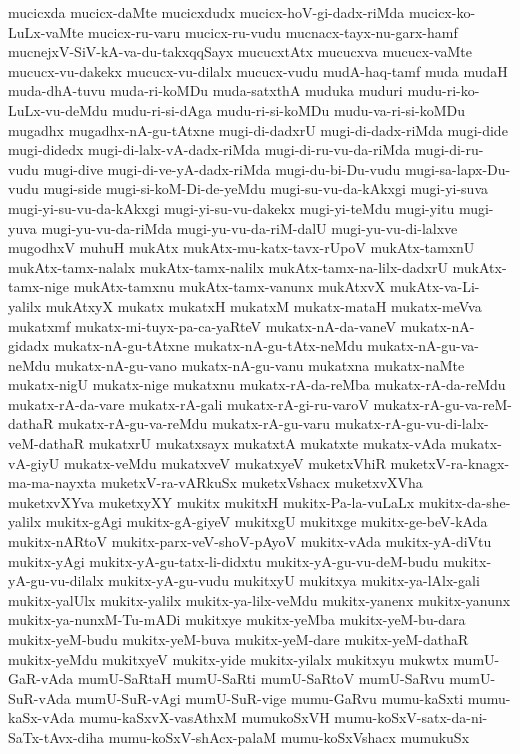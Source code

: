{mucicxda
mucicx-daMte
mucicxdudx
mucicx-hoV-gi-dadx-riMda
mucicx-ko-LuLx-vaMte
mucicx-ru-varu
mucicx-ru-vudu
mucnacx-tayx-nu-garx-hamf
mucnejxV-SiV-kA-va-du-takxqqSayx
mucucxtAtx
mucucxva
mucucx-vaMte
mucucx-vu-dakekx
mucucx-vu-dilalx
mucucx-vudu
mudA-haq-tamf
muda
mudaH
muda-dhA-tuvu
muda-ri-koMDu
muda-satxthA
muduka
muduri
mudu-ri-ko-LuLx-vu-deMdu
mudu-ri-si-dAga
mudu-ri-si-koMDu
mudu-va-ri-si-koMDu
mugadhx
mugadhx-nA-gu-tAtxne
mugi-di-dadxrU
mugi-di-dadx-riMda
mugi-dide
mugi-didedx
mugi-di-lalx-vA-dadx-riMda
mugi-di-ru-vu-da-riMda
mugi-di-ru-vudu
mugi-dive
mugi-di-ve-yA-dadx-riMda
mugi-du-bi-Du-vudu
mugi-sa-lapx-Du-vudu
mugi-side
mugi-si-koM-Di-de-yeMdu
mugi-su-vu-da-kAkxgi
mugi-yi-suva
mugi-yi-su-vu-da-kAkxgi
mugi-yi-su-vu-dakekx
mugi-yi-teMdu
mugi-yitu
mugi-yuva
mugi-yu-vu-da-riMda
mugi-yu-vu-da-riM-dalU
mugi-yu-vu-di-lalxve
mugodhxV
muhuH
mukAtx
mukAtx-mu-katx-tavx-rUpoV
mukAtx-tamxnU
mukAtx-tamx-nalalx
mukAtx-tamx-nalilx
mukAtx-tamx-na-lilx-dadxrU
mukAtx-tamx-nige
mukAtx-tamxnu
mukAtx-tamx-vanunx
mukAtxvX
mukAtx-va-Li-yalilx
mukAtxyX
mukatx
mukatxH
mukatxM
mukatx-mataH
mukatx-meVva
mukatxmf
mukatx-mi-tuyx-pa-ca-yaRteV
mukatx-nA-da-vaneV
mukatx-nA-gidadx
mukatx-nA-gu-tAtxne
mukatx-nA-gu-tAtx-neMdu
mukatx-nA-gu-va-neMdu
mukatx-nA-gu-vano
mukatx-nA-gu-vanu
mukatxna
mukatx-naMte
mukatx-nigU
mukatx-nige
mukatxnu
mukatx-rA-da-reMba
mukatx-rA-da-reMdu
mukatx-rA-da-vare
mukatx-rA-gali
mukatx-rA-gi-ru-varoV
mukatx-rA-gu-va-reM-dathaR
mukatx-rA-gu-va-reMdu
mukatx-rA-gu-varu
mukatx-rA-gu-vu-di-lalx-veM-dathaR
mukatxrU
mukatxsayx
mukatxtA
mukatxte
mukatx-vAda
mukatx-vA-giyU
mukatx-veMdu
mukatxveV
mukatxyeV
muketxVhiR
muketxV-ra-knagx-ma-ma-nayxta
muketxV-ra-vARkuSx
muketxVshacx
muketxvXVha
muketxvXYva
muketxyXY
mukitx
mukitxH
mukitx-Pa-la-vuLaLx
mukitx-da-she-yalilx
mukitx-gAgi
mukitx-gA-giyeV
mukitxgU
mukitxge
mukitx-ge-beV-kAda
mukitx-nARtoV
mukitx-parx-veV-shoV-pAyoV
mukitx-vAda
mukitx-yA-diVtu
mukitx-yAgi
mukitx-yA-gu-tatx-li-didxtu
mukitx-yA-gu-vu-deM-budu
mukitx-yA-gu-vu-dilalx
mukitx-yA-gu-vudu
mukitxyU
mukitxya
mukitx-ya-lAlx-gali
mukitx-yalUlx
mukitx-yalilx
mukitx-ya-lilx-veMdu
mukitx-yanenx
mukitx-yanunx
mukitx-ya-nunxM-Tu-mADi
mukitxye
mukitx-yeMba
mukitx-yeM-bu-dara
mukitx-yeM-budu
mukitx-yeM-buva
mukitx-yeM-dare
mukitx-yeM-dathaR
mukitx-yeMdu
mukitxyeV
mukitx-yide
mukitx-yilalx
mukitxyu
mukwtx
mumU-GaR-vAda
mumU-SaRtaH
mumU-SaRti
mumU-SaRtoV
mumU-SaRvu
mumU-SuR-vAda
mumU-SuR-vAgi
mumU-SuR-vige
mumu-GaRvu
mumu-kaSxti
mumu-kaSx-vAda
mumu-kaSxvX-vasAthxM
mumukoSxVH
mumu-koSxV-satx-da-ni-SaTx-tAvx-diha
mumu-koSxV-shAcx-palaM
mumu-koSxVshacx
mumukuSx
}
